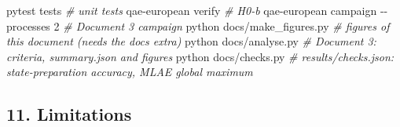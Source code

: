 \documentclass[
  10pt,
]{article}
\newenvironment{Shaded}{}{}
\newcommand{\AttributeTok}[1]{\textcolor[rgb]{0.49,0.56,0.16}{#1}}
\newcommand{\CommentTok}[1]{\textcolor[rgb]{0.38,0.63,0.69}{\textit{#1}}}
\newcommand{\ExtensionTok}[1]{#1}
\newcommand{\NormalTok}[1]{#1}
\begin{document}
\begin{Shaded}
\begin{Highlighting}[]
\ExtensionTok{pytest}\NormalTok{ tests                                   }\CommentTok{\# unit tests}
\ExtensionTok{qae{-}european}\NormalTok{ verify                            }\CommentTok{\# H0{-}b}
\ExtensionTok{qae{-}european}\NormalTok{ campaign }\AttributeTok{{-}{-}processes}\NormalTok{ 2            }\CommentTok{\# Document 3 campaign}
\ExtensionTok{python}\NormalTok{ docs/make\_figures.py                    }\CommentTok{\# figures of this document (needs the docs extra)}
\ExtensionTok{python}\NormalTok{ docs/analyse.py                         }\CommentTok{\# Document 3: criteria, summary.json and figures}
\ExtensionTok{python}\NormalTok{ docs/checks.py                          }\CommentTok{\# results/checks.json: state{-}preparation accuracy, MLAE global maximum}
\end{Highlighting}
\end{Shaded}

\hypertarget{11-limitations}{%
\subsection{11. Limitations}\label{11-limitations}}
\end{document}
